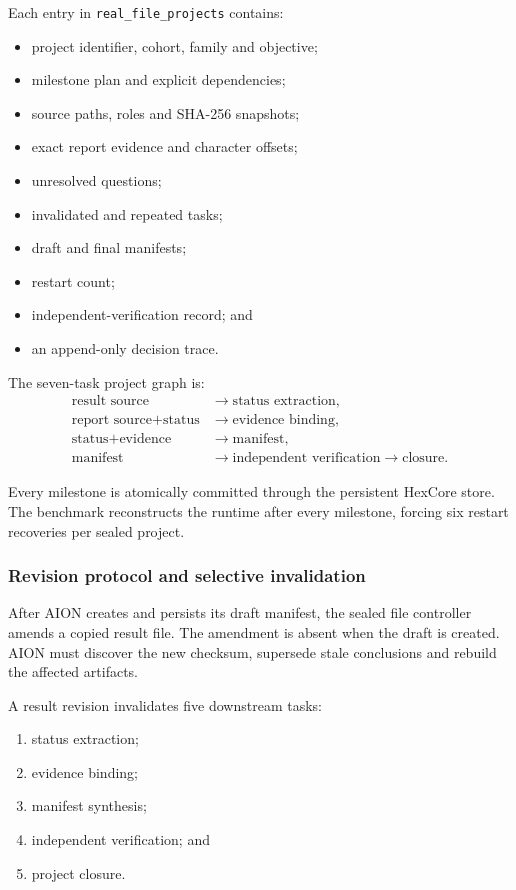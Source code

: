 Each entry in \texttt{real\_file\_projects} contains:
\begin{itemize}
    \item project identifier, cohort, family and objective;
    \item milestone plan and explicit dependencies;
    \item source paths, roles and SHA-256 snapshots;
    \item exact report evidence and character offsets;
    \item unresolved questions;
    \item invalidated and repeated tasks;
    \item draft and final manifests;
    \item restart count;
    \item independent-verification record; and
    \item an append-only decision trace.
\end{itemize}

The seven-task project graph is:
\[
\begin{aligned}
\text{result source}
&\rightarrow \text{status extraction},\\
\text{report source}+\text{status}
&\rightarrow \text{evidence binding},\\
\text{status}+\text{evidence}
&\rightarrow \text{manifest},\\
\text{manifest}
&\rightarrow \text{independent verification}
\rightarrow \text{closure}.
\end{aligned}
\]

Every milestone is atomically committed through the persistent HexCore store.
The benchmark reconstructs the runtime after every milestone, forcing six
restart recoveries per sealed project.

\subsubsection{Revision protocol and selective invalidation}

After AION creates and persists its draft manifest, the sealed file controller
amends a copied result file.  The amendment is absent when the draft is
created.  AION must discover the new checksum, supersede stale conclusions
and rebuild the affected artifacts.

A result revision invalidates five downstream tasks:
\begin{enumerate}
    \item status extraction;
    \item evidence binding;
    \item manifest synthesis;
    \item independent verification; and
    \item project closure.
\end{enumerate}

